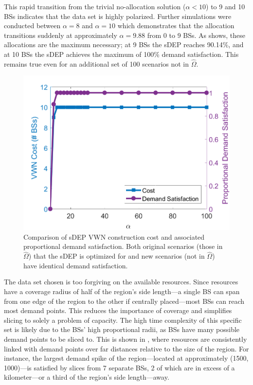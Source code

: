\documentclass[12pt,dvipsnames]{report}
\begin{document}
This rapid transition from the trivial no-allocation solution ($\alpha < 10$) to 9 and 10 BSs indicates that the data set is highly polarized.  Further simulations were conducted between $\alpha = 8$ and $\alpha = 10$ which demonstrates that the allocation transitions suddenly at approximately $\alpha = 9.88$ from 0 to 9 BSs.  As  shows, these allocations are the maximum necessary; at 9 BSs the sDEP reaches 90.14\%, and at 10 BSs the sDEP achieves the maximum of 100\% demand satisfaction.  This remains true even for an additional set of 100 scenarios not in $\hat{\Omega}$.

\begin{figure}[htp]
	\centering
	\includegraphics[height=0.4\textheight]{Figures/CaseI_sDEPComparisonCostSat}
	\caption[Comparison of sDEP approach costs and demand satisfaction for Case I simulations]{Comparison of sDEP VWN construction cost and associated proportional demand satisfaction.  Both original scenarios (those in $\hat{\Omega}$) that the sDEP is optimized for and new scenarios (not in $\hat{\Omega}$) have identical demand satisfaction.}
	\label{fig:CaseI_sDEPComparisonCostSat}
\end{figure}

The data set chosen is too forgiving on the available resources.  Since resources have a coverage radius of half of the region's side length---a single BS can span from one edge of the region to the other if centrally placed---most BSs can reach most demand points.  This reduces the importance of coverage and simplifies slicing to solely a problem of capacity.  The high time complexity of this specific set is likely due to the BSs' high proportional radii, as BSs have many possible demand points to be sliced to.  This is shown in , where resources are consistently linked with demand points over far distances relative to the size of the region.  For instance, the largest demand spike of the region---located at approximately (1500, 1000)---is satisfied by slices from 7 separate BSs, 2 of which are in excess of a kilometer---or a third of the region's side length---away.
\end{document}
